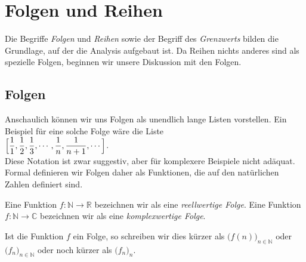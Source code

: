 \chapter{Folgen und Reihen \label{chapter:folgen-und-reihen}}
Die Begriffe \emph{Folgen} und \emph{Reihen} sowie der Begriff des \emph{Grenzwerts} bilden die
Grundlage, auf der die Analysis aufgebaut ist.  Da Reihen nichts anderes sind als
spezielle Folgen, beginnen wir unsere Diskussion mit den Folgen.

\section{Folgen}
Anschaulich k\"onnen wir uns Folgen als unendlich lange Listen vorstellen.  Ein Beispiel f\"ur eine
solche Folge w\"are die Liste
\\[0.2cm]
\hspace*{1.3cm}
$\displaystyle \Bigl[\frac{1}{1},\frac{1}{2},\frac{1}{3}, \cdots, \frac{1}{n}, \frac{1}{n+1}, \cdots\Bigr]$.
\\[0.2cm]
Diese Notation ist zwar suggestiv, aber f\"ur komplexere Beispiele nicht ad\"aquat.
Formal definieren wir Folgen daher als Funktionen, die auf den nat\"urlichen Zahlen definiert sind. 


\begin{Definition}[Folge]
  Eine Funktion $f\!:\! \mathbb{N} \rightarrow \mathbb{R}$ bezeichnen wir als eine  \emph{reellwertige Folge}. 
  Eine Funktion $f\!:\! \mathbb{N} \rightarrow \mathbb{C}$ bezeichnen wir als eine  \emph{komplexwertige Folge}. \eod
\end{Definition}

\noindent
Ist die Funktion $f$ ein Folge, so schreiben wir dies k\"urzer als 
$\bigl(f(n)\bigr)_{n\in\mathbb{N}}$ oder $\bigl(f_n\bigr)_{n\in\mathbb{N}}$ oder noch k\"urzer als $\bigl(f_n\bigr)_n$.


